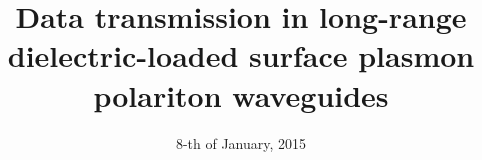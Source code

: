 
\usepackage{graphicx}          %
\usepackage{hyperref}          %
\usepackage{pgf}               %
\usepackage{fancybox}          %
\usepackage{pgfpages}
\usepackage{amsfonts}          %
\usepackage{pifont}            %
\newcommand{\cmark}{\ding{51}}%
\newcommand{\xmark}{\ding{55}}%

\graphicspath{ {./img/} }



\title[Data transmission in LR-DLSPPW]
      {Data transmission in long-range dielectric-loaded surface plasmon 
      polariton waveguides}

\date[Nanometa-2015]{8-th of January, 2015}



